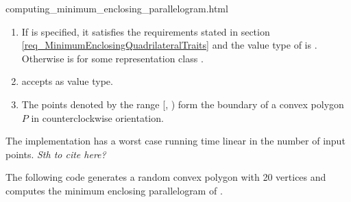 \begin{ccHtmlClassFile}{computing_minimum_enclosing_parallelogram.html}
  \begin{enumerate}
  \item If  is specified, it satisfies the requirements
    stated in section \ref{req_MinimumEnclosingQuadrilateralTraits}
    and the value type  of  is
    . Otherwise  is
     for some representation class .
  \item {} accepts  as value type.
  \item The points denoted by the range [,
    ) form the boundary of a convex polygon $P$ in
    counterclockwise orientation.
  \end{enumerate}
  
  \ccImplementation The implementation has a worst case running time
  linear in the number of input points. \textit{Sth to cite here?}
  
  \ccExample The following code generates a random convex polygon
   with 20 vertices and computes the minimum enclosing
  parallelogram of .


\end{ccHtmlClassFile}

